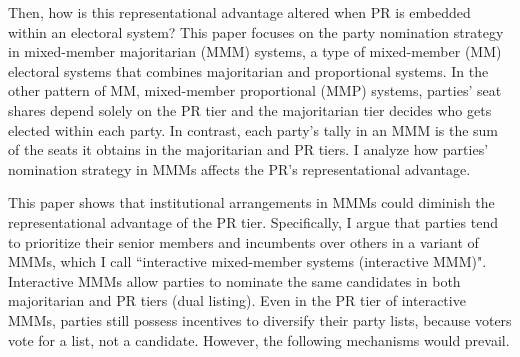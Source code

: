 \documentclass[a4paper, 11pt]{article}
\begin{document}
Then, how is this representational advantage altered when PR is embedded within an electoral system? This paper focuses on the party nomination strategy in mixed-member majoritarian (MMM) systems, a type of mixed-member (MM) electoral systems \citep{shugartMixedmemberElectoralSystems2003} that combines majoritarian and proportional systems.\footnotemark{} In the other pattern of MM, mixed-member proportional  (MMP) systems, parties' seat shares depend solely on the PR tier and the majoritarian tier decides who gets elected within each party. In contrast, each party's tally in an MMM is the sum of the seats it obtains in the majoritarian and PR tiers. I analyze how parties' nomination strategy in MMMs affects the PR's representational advantage.


This paper shows that institutional arrangements in MMMs could diminish the representational advantage of the PR tier. Specifically, I argue that parties tend to prioritize their senior members and incumbents over others in a variant of MMMs, which I call ``interactive mixed-member systems (interactive MMM)".\footnotemark{} Interactive MMMs allow parties to nominate the same candidates in both majoritarian and PR tiers (dual listing). Even in the PR tier of interactive MMMs, parties still possess incentives to diversify their party lists, because voters vote for a list, not a candidate. However, the following mechanisms would prevail. 

\end{document}
